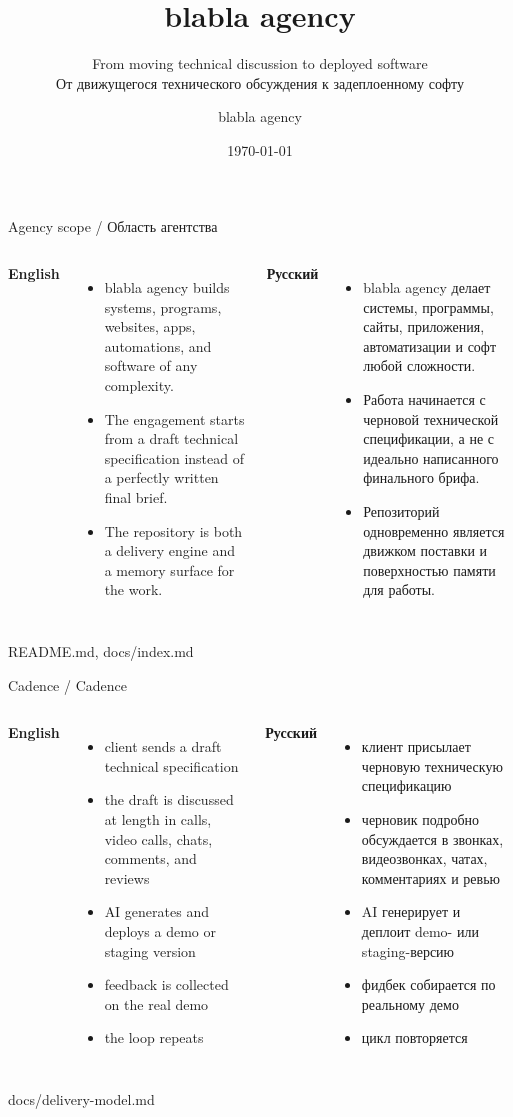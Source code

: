 \documentclass[aspectratio=169]{beamer}
\title{blabla agency}
\subtitle{From moving technical discussion to deployed software\\От движущегося технического обсуждения к задеплоенному софту}
\author{blabla agency}
\date{\today}
\newcommand{\BilingualFrame}[4]{
  \begin{frame}{#1}
    \small
    \begin{columns}[T,onlytextwidth]
      \column{0.48\textwidth}
      \textbf{English}
      #2
      \column{0.48\textwidth}
      \textbf{Русский}
      #3
    \end{columns}
    \vfill
    {\tiny #4}
  \end{frame}
}
\begin{document}
\begin{frame}
  \titlepage
\end{frame}

\BilingualFrame
  {Agency scope / Область агентства}
  {
    \begin{itemize}
      \item blabla agency builds systems, programs, websites, apps, automations, and software of any complexity.
      \item The engagement starts from a draft technical specification instead of a perfectly written final brief.
      \item The repository is both a delivery engine and a memory surface for the work.
    \end{itemize}
  }
  {
    \begin{itemize}
      \item blabla agency делает системы, программы, сайты, приложения, автоматизации и софт любой сложности.
      \item Работа начинается с черновой технической спецификации, а не с идеально написанного финального брифа.
      \item Репозиторий одновременно является движком поставки и поверхностью памяти для работы.
    \end{itemize}
  }
  {README.md, docs/index.md}

\BilingualFrame
  {Cadence / Cadence}
  {
    \begin{itemize}
      \item client sends a draft technical specification
      \item the draft is discussed at length in calls, video calls, chats, comments, and reviews
      \item AI generates and deploys a demo or staging version
      \item feedback is collected on the real demo
      \item the loop repeats
    \end{itemize}
  }
  {
    \begin{itemize}
      \item клиент присылает черновую техническую спецификацию
      \item черновик подробно обсуждается в звонках, видеозвонках, чатах, комментариях и ревью
      \item AI генерирует и деплоит demo- или staging-версию
      \item фидбек собирается по реальному демо
      \item цикл повторяется
    \end{itemize}
  }
  {docs/delivery-model.md}
\end{document}
